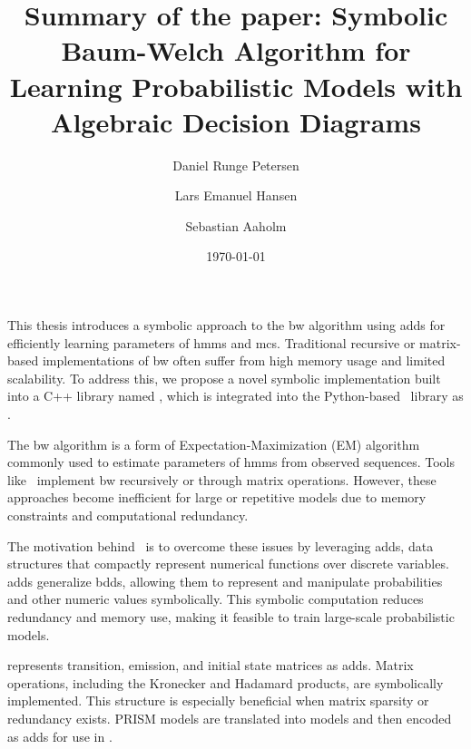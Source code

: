 \documentclass[a4paper]{article}
\title{Summary of the paper: Symbolic Baum-Welch Algorithm for Learning Probabilistic Models with Algebraic Decision Diagrams}
\date{\today}
\author{Daniel Runge Petersen \and Lars Emanuel Hansen \and Sebastian Aaholm}
\begin{document}
\maketitle
\thispagestyle{empty}
This thesis introduces a symbolic approach to the \gls{bw} algorithm using \glspl{add} for efficiently learning parameters of \glspl{hmm} and \glspl{mc}.
Traditional recursive or matrix-based implementations of \gls{bw} often suffer from high memory usage and limited scalability.
To address this, we propose a novel symbolic implementation built into a C++ library named \Cupaal, which is integrated into the Python-based \Jajapy\ library as \JajapyTwo.

The \gls{bw} algorithm is a form of Expectation-Maximization (EM) algorithm commonly used to estimate parameters of \glspl{hmm} from observed sequences.
Tools like \Jajapy\ implement \gls{bw} recursively or through matrix operations.
However, these approaches become inefficient for large or repetitive models due to memory constraints and computational redundancy.

The motivation behind \Cupaal\ is to overcome these issues by leveraging \glspl{add}, data structures that compactly represent numerical functions over discrete variables.
\glspl{add} generalize \glspl{bdd}, allowing them to represent and manipulate probabilities and other numeric values symbolically.
This symbolic computation reduces redundancy and memory use, making it feasible to train large-scale probabilistic models.

\Cupaal represents transition, emission, and initial state matrices as \glspl{add}.
Matrix operations, including the Kronecker and Hadamard products, are symbolically implemented.
This structure is especially beneficial when matrix sparsity or redundancy exists.
PRISM models are translated into \Jajapy models and then encoded as \glspl{add} for use in \Cupaal.
\end{document}
